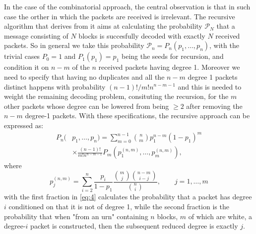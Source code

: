 In the case of the combinatorial approach, the central observation is that in such case the orther in which the packets are received is irrelevant. The recursive algorithm that derives from it aims at calculating the probability $\mathcal{P}_N$ that a message consisting of $N$ blocks is succesfully decoded with exactly $N$ received packets. So in general we take this probability $\mathcal{P}_n = P_n(p_1,\dots,p_n)$, with the trivial cases $P_0=1$ and $P_1(p_1) = p_1$ being the seeds for recursion, and condition it on $n-m$ of the $n$ received packets having degree 1. Moreover we need to specify that having no duplicates and all the $n-m$ degree 1 packets distinct happens with probability $(n-1)!/m!n^{n-m-1}$ and this is needed to weight the remaining decoding problem, consituting the recursion, for the $m$ other packets whose degree can be lowered from being $\geq 2$ after removing the $n-m$ degree-1 packets. With these specifications, the recursive approach can be expressed as:
\begin{align}
    P_n(&p_1,\dots,p_n) = \sum_{m=0}^{n-1}\binom{n}{m}p_1^{n-m}(1-p_1)^m\\
    &\times\frac{(n-1)!}{m!n^{n-m-1}}P_m(p_1^{(n,m)},\dots,p_m^{(n,m)}),
    \label{eq:3}
\end{align}
where
\begin{equation}
  p_j^{(n,m)} = \sum_{i=2}^{n}\frac{p_i}{1-p_1}\frac{\binom{m}{j}\binom{n-m}{i-j}}{\binom{n}{i}}, \qquad j = 1,\dots,m
  \label{eq:4}
\end{equation}
with the first fraction in \ref{eq:4} calculates the probability that a packet has degree $i$ conditioned on that it is not of degree 1, while the second fraction is the probability that when "from an urn" containing $n$ blocks, $m$ of which are white, a degree-$i$ packet is constructed, then the subsequent reduced degree is exactly $j$\cite{Hyytia2007}.

